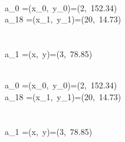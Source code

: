 \begin{center}
\\
a_0 =(x_0,\ y_0)=(2,\ 152.34)\\
a_{18} =(x_1,\ y_1)=(20,\ 14.73)\\
\ \\

\\
a_1 =(x,\ y)=(3,\ 78.85)\\
\end{center}

\begin{center}
\\
a_0 =(x_0,\ y_0)=(2,\ 152.34)\\
a_{18} =(x_1,\ y_1)=(20,\ 14.73)\\
\ \\

\\
a_1 =(x,\ y)=(3,\ 78.85)\\
\end{center}
